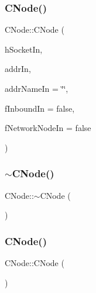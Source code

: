 \subsubsection{\texorpdfstring{C\+Node()}{CNode()}\hspace{0.1cm}{\footnotesize\ttfamily [1/2]}}
{\footnotesize\ttfamily C\+Node\+::\+C\+Node (\begin{DoxyParamCaption}\item[{\mbox{\hyperlink{compat_8h_a26ef1173e2f2c0d3db27eca28397d723}{S\+O\+C\+K\+ET}}}]{h\+Socket\+In,  }\item[{const \mbox{\hyperlink{class_c_address}{C\+Address}} \&}]{addr\+In,  }\item[{const std\+::string \&}]{addr\+Name\+In = {\ttfamily \char`\"{}\char`\"{}},  }\item[{bool}]{f\+Inbound\+In = {\ttfamily false},  }\item[{bool}]{f\+Network\+Node\+In = {\ttfamily false} }\end{DoxyParamCaption})}

\mbox{\label{class_c_node_ac9b30cb93e91a48dacc58821abfc44f0}} 
\subsubsection{\texorpdfstring{$\sim$\+C\+Node()}{~CNode()}}
{\footnotesize\ttfamily C\+Node\+::$\sim$\+C\+Node (\begin{DoxyParamCaption}{ }\end{DoxyParamCaption})}

\mbox{\label{class_c_node_abd071f2747ad0e0e693df1828e9b8ea3}} 
\subsubsection{\texorpdfstring{C\+Node()}{CNode()}\hspace{0.1cm}{\footnotesize\ttfamily [2/2]}}
{\footnotesize\ttfamily C\+Node\+::\+C\+Node (\begin{DoxyParamCaption}\item[{const \mbox{\hyperlink{class_c_node}{C\+Node}} \&}]{ }\end{DoxyParamCaption})\hspace{0.3cm}{\ttfamily [private]}}



